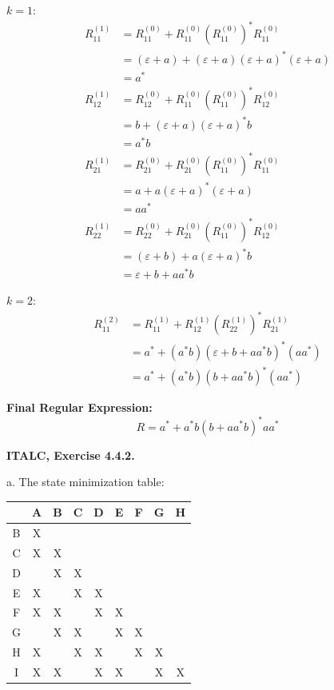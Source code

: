 \documentclass{article}
\theoremstyle{theorem}
\theoremstyle{definition}
\theoremstyle{remark}
\begin{document}
$k=1$:
\begin{align*}
R_{11}^{(1)} &= R_{11}^{(0)} + R_{11}^{(0)}(R_{11}^{(0)})^* R_{11}^{(0)} \\
&= (\varepsilon + a) + (\varepsilon + a)(\varepsilon + a)^* (\varepsilon + a) \\
&= a^* \\[10pt]
%
R_{12}^{(1)} &= R_{12}^{(0)} + R_{11}^{(0)}(R_{11}^{(0)})^* R_{12}^{(0)} \\
&= b + (\varepsilon + a)(\varepsilon + a)^* b \\
&= a^* b \\[10pt]
%
R_{21}^{(1)} &= R_{21}^{(0)} + R_{21}^{(0)}(R_{11}^{(0)})^* R_{11}^{(0)} \\
&= a + a(\varepsilon + a)^* (\varepsilon + a) \\ 
&= aa^* \\[10pt]
%
R_{22}^{(1)} &= R_{22}^{(0)} + R_{21}^{(0)}(R_{11}^{(0)})^* R_{12}^{(0)} \\
&= (\varepsilon + b) + a(\varepsilon + a)^* b \\
&= \varepsilon + b + aa^* b
\end{align*}

$k=2$:
\begin{align*}
R_{11}^{(2)} &= R_{11}^{(1)} + R_{12}^{(1)}(R_{22}^{(1)})^* R_{21}^{(1)} \\
&= a^* + (a^* b)(\varepsilon + b + aa^* b)^* (aa^*) \\
&= a^* + (a^* b)(b + aa^* b)^* (aa^*)
\end{align*}

\vspace{1cm}
\textbf{Final Regular Expression:}
\[ R = a^* + a^* b (b + aa^* b)^* aa^* \]

\textbf{ITALC, Exercise 4.4.2.}

a. The state minimization table:
\begin{tabular}{c|cccccccc}
    & A & B & C & D & E & F & G & H \\ \hline
    B & X &   &   &   &   &   &   &   \\
    C & X & X &   &   &   &   &   &   \\
    D &   & X & X &   &   &   &   &   \\
    E & X &   & X & X &   &   &   &   \\
    F & X & X &   & X & X &   &   &   \\
    G &   & X & X &   & X & X &   &   \\
    H & X &   & X & X &   & X & X &   \\
    I & X & X &   & X & X &   & X & X \\
\end{tabular}
\end{document}
